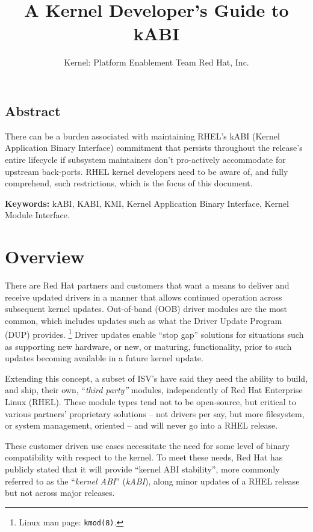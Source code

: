 \documentclass[10pt,oneside,english]{book}
\begin{document}
\title{A Kernel Developer's Guide to kABI}

\author{Kernel: Platform Enablement Team Red Hat, Inc.}
\maketitle

\newlength{\mpwidth}
\setlength{\mpwidth}{1\columnwidth - 2\fboxsep - 2\fboxrule - \shadowsize}

\section*{Abstract}

There can be a burden associated with maintaining RHEL's kABI (Kernel
Application Binary Interface) commitment that persists throughout
the release's entire lifecycle if subsystem maintainers don't pro-actively
accommodate for upstream back-ports. RHEL kernel developers need to
be aware of, and fully comprehend, such restrictions, which is the
focus of this document.

\textbf{Keywords:} kABI, KABI, KMI, Kernel Application Binary Interface,
Kernel Module Interface.

\tableofcontents{}

\chapter{Overview}

There are Red Hat partners and customers that want a means to deliver
and receive updated drivers in a manner that allows continued operation
across subsequent kernel updates. Out-of-band (OOB) driver modules
are the most common, which includes updates such as what the Driver
Update Program (DUP) provides. \footnote{Linux man page: \texttt{kmod(8)}.}
Driver updates enable ``stop gap'' solutions for situations such
as supporting new hardware, or new, or maturing, functionality, prior
to such updates becoming available in a future kernel update.

Extending this concept, a subset of ISV's have said they need the
ability to build, and ship, their own, ``\emph{third party'' }modules,
independently of Red Hat Enterprise Linux (RHEL). These module types
tend not to be open-source, but critical to various partners' proprietary
solutions -- not drivers per say, but more filesystem, or system
management, oriented -- and will never go into a RHEL release.

These customer driven use cases necessitate the need for some level
of binary compatibility with respect to the kernel. To meet these
needs, Red Hat has publicly stated that it will provide ``kernel
ABI stability'', more commonly referred to as the ``\emph{kernel
ABI}'' (\emph{kABI}), along minor updates of a RHEL release but not
across major releases.
\end{document}

